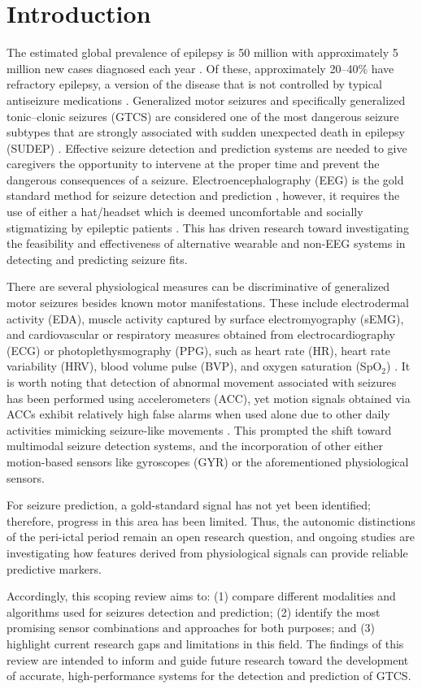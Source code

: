\section{Introduction}
The estimated global prevalence of epilepsy is 50 million with approximately 5 million new cases diagnosed each year \cite{whoEpilepsy}. Of these, approximately 20–40\% have refractory epilepsy, a version of the disease that is not controlled by typical antiseizure medications \cite{Kwan2000-jq}. Generalized motor seizures and specifically generalized tonic–clonic seizures (GTCS) are considered one of the most dangerous seizure subtypes that are strongly associated with sudden unexpected death in epilepsy (SUDEP) \cite{Devinsky2016-tn}. Effective seizure detection and prediction systems are needed to give caregivers the opportunity to intervene at the proper time and prevent the dangerous consequences of a seizure. Electroencephalography (EEG) is the gold standard method for seizure detection \cite{Noachtar2009-am} and prediction \cite{Rasheed2021-de}, however, it requires the use of either a hat/headset which is deemed uncomfortable and socially stigmatizing by epileptic patients \cite{Hadady2025-gc}. This has driven research toward investigating the feasibility and effectiveness of alternative wearable and non-EEG systems in detecting and predicting seizure fits.

There are several physiological measures can be discriminative of generalized motor seizures besides known motor manifestations. These include electrodermal activity (EDA), muscle activity captured by surface electromyography (sEMG), and cardiovascular or respiratory measures obtained from electrocardiography (ECG) or photoplethysmography (PPG), such as heart rate (HR), heart rate variability (HRV), blood volume pulse (BVP), and oxygen saturation (SpO$_2$) \cite{Casanovas_Ortega2022-yx,Baumgartner2021-fv,Beniczky2016-ra,Baumgartner2019-wy}. It is worth noting that detection of abnormal movement associated with seizures has been performed using accelerometers (ACC), yet motion signals obtained via ACCs exhibit relatively high false alarms when used alone due to other daily activities mimicking seizure-like movements \cite{Atwood2021-ux}. This prompted the shift toward multimodal seizure detection systems, and the incorporation of other either motion-based sensors like gyroscopes (GYR) or the aforementioned physiological sensors.

For seizure prediction, a gold-standard signal has not yet been identified; therefore, progress in this area has been limited. Thus, the autonomic distinctions of the peri-ictal period remain an open research question, and ongoing studies are investigating how features derived from physiological signals can provide reliable predictive markers.

Accordingly, this scoping review aims to: (1) compare different modalities and algorithms used for seizures detection and prediction; (2) identify the most promising sensor combinations and approaches for both purposes; and (3) highlight current research gaps and limitations in this field. The findings of this review are intended to inform and guide future research toward the development of accurate, high-performance systems for the detection and prediction of GTCS.
